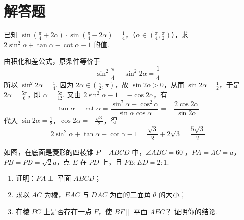 \section{解答题}
\begin{problem}
已知 \(\sin\left(\frac{\pi}{4}+2\alpha\right)\cdot\sin\left(\frac{\pi}{4}-2\alpha\right)=\frac{1}{4}\)，（\(\alpha\in\left(\frac{\pi}{4},\frac{\pi}{2}\right)\)），求 \(2\sin^2\alpha+\tan\alpha-\cot\alpha-1\) 的值.
\end{problem}

\begin{solution}
由积化和差公式，原条件等价于
\[
\sin^2\frac{\pi}{4}-\sin^2 2\alpha=\frac{1}{4}
\]
所以 \(\sin^2 2\alpha=\frac{1}{4}\). 因为 \(2\alpha\in\left(\frac{\pi}{2},\pi\right)\)，故 \(\sin 2\alpha>0\)，从而 \(\sin 2\alpha=\frac{1}{2}\)，于是 \(2\alpha=\frac{5\pi}{6}\)，即 \(\alpha=\frac{5\pi}{12}\). 又由 \(2\sin^2\alpha-1=-\cos 2\alpha\)，有
\[
\tan\alpha-\cot\alpha=\frac{\sin^2\alpha-\cos^2\alpha}{\sin\alpha\cos\alpha}=-\frac{2\cos 2\alpha}{\sin 2\alpha}
\]
代入 \(\sin 2\alpha=\frac{1}{2}\)，\(\cos 2\alpha=-\frac{\sqrt{3}}{2}\)，得
\[
2\sin^2\alpha+\tan\alpha-\cot\alpha-1=\frac{\sqrt{3}}{2}+2\sqrt{3}=\frac{5\sqrt{3}}{2}
\]
\end{solution}

\begin{problem}
如图，在底面是菱形的四棱锥 \(P-ABCD\) 中，\(\angle ABC=60^{\circ}\)，\(PA=AC=a\)，\(PB=PD=\sqrt{2}a\)，点 \(E\) 在 \(PD\) 上，且 \(PE:ED=2:1\).

\begin{enumerate}
\item 证明：\(PA\perp\) 平面 \(ABCD\)；
\item 求以 \(AC\) 为棱，\(EAC\) 与 \(DAC\) 为面的二面角 \(\theta\) 的大小；
\item 在棱 \(PC\) 上是否存在一点 \(F\)，使 \(BF\parallel\) 平面 \(AEC\)？ 证明你的结论.
\end{enumerate}

\end{problem}

